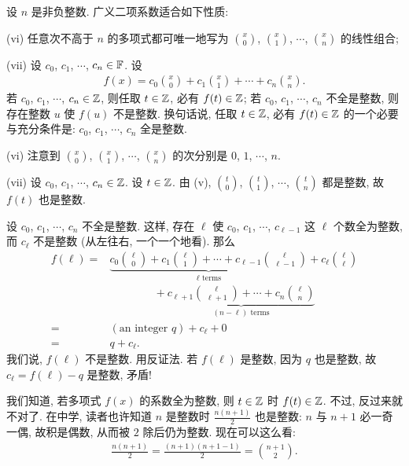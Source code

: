 \begin{proposition}
    设 $n$ 是非负整数. 广义二项系数适合如下性质:

    (vi) 任意次不高于 $n$ 的多项式都可唯一地写为 $\binom{x}{0}$, $\binom{x}{1}$, $\cdots$, $\binom{x}{n}$ 的线性组合;

    (vii) 设 $c_0$, $c_1$, $\cdots$, $c_n \in \mathbb{F}$. 设
    \begin{align*}
        f(x) = c_0 \binom{x}{0} + c_1 \binom{x}{1} + \cdots + c_n \binom{x}{n}.
    \end{align*}
    若 $c_0$, $c_1$, $\cdots$, $c_n \in \mathbb{Z}$, 则任取 $t \in \mathbb{Z}$, 必有 $f(t) \in \mathbb{Z}$; 若 $c_0$, $c_1$, $\cdots$, $c_n$ 不全是整数, 则存在整数 $u$ 使 $f(u)$ 不是整数. 换句话说, 任取 $t \in \mathbb{Z}$, 必有 $f(t) \in \mathbb{Z}$ 的一个必要与充分条件是: $c_0$, $c_1$, $\cdots$, $c_n$ 全是整数.
\end{proposition}

\begin{pf}
    (vi) 注意到 $\binom{x}{0}$, $\binom{x}{1}$, $\cdots$, $\binom{x}{n}$ 的次分别是 $0$, $1$, $\cdots$, $n$.

    (vii) 设 $c_0$, $c_1$, $\cdots$, $c_n \in \mathbb{Z}$. 设 $t \in \mathbb{Z}$. 由 (v), $\binom{t}{0}$, $\binom{t}{1}$, $\cdots$, $\binom{t}{n}$ 都是整数, 故 $f(t)$ 也是整数.

    设 $c_0$, $c_1$, $\cdots$, $c_n$ 不全是整数. 这样, 存在 $\ell$ 使 $c_0$, $c_1$, $\cdots$, $c_{\ell - 1}$ 这 $\ell$ 个数全为整数, 而 $c_{\ell}$ 不是整数 (从左往右, 一个一个地看). 那么
    \begin{align*}
        f(\ell)
        = {} & \underbrace{c_0 \binom{\ell}{0} + c_1 \binom{\ell}{1} + \cdots
            + c_{\ell - 1} \binom{\ell}{\ell - 1}}_{\text{$\ell$ terms}}
        {} + c_{\ell} \binom{\ell}{\ell}                                       \\
             & \qquad \qquad + \underbrace{c_{\ell + 1} \binom{\ell}{\ell + 1}
        + \cdots + c_{n} \binom{\ell}{n}}_{\text{$(n - \ell)$ terms}}          \\
        = {} & (\text{an integer $q$}) + c_{\ell} + 0                          \\
        = {} & q + c_{\ell}.
    \end{align*}
    我们说, $f(\ell)$ 不是整数. 用反证法. 若 $f(\ell)$ 是整数, 因为 $q$ 也是整数, 故 $c_{\ell} = f(\ell) - q$ 是整数, 矛盾!
\end{pf}

\begin{example}
    我们知道, 若多项式 $f(x)$ 的系数全为整数, 则 $t \in \mathbb{Z}$ 时 $f(t) \in \mathbb{Z}$. 不过, 反过来就不对了. 在中学, 读者也许知道 $n$ 是整数时 $\frac{n(n+1)}{2}$ 也是整数: $n$ 与 $n+1$ 必一奇一偶, 故积是偶数, 从而被 $2$ 除后仍为整数. 现在可以这么看:
    \begin{align*}
        \frac{n(n+1)}{2} = \frac{(n+1)(n+1-1)}{2} = \binom{n+1}{2}.
    \end{align*}
\end{example}

